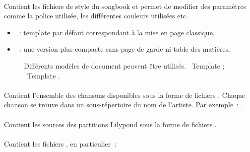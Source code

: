 \paragraph{}
Contient les fichiers de style du songbook et permet de modifier des
paramètres comme la police utilisée, les différentes couleurs
utilisées etc.

\begin{itemize}
\item {}~: template par défaut correspondant à la
  mise en page classique.
\item {}~: une version plus compacte sans page de
  garde ni table des matières.
\end{itemize}

\begin{figure}
  \centering
  \hspace{0.1cm}%
  \caption[Templates]{%
    Différents modèles de document peuvent être utilisés.
    ~Template ; %
    ~Template .%
  }%
  \label{fig:templates}
\end{figure}


\paragraph{}
Contient l'ensemble des chansons disponibles sous la forme de fichiers
. Chaque chanson se trouve dans un sous-répertoire du nom
de l'artiste. Par exemple~:
.

\paragraph{}
Contient les sources des partitions Lilypond sous la forme de fichiers
.

\paragraph{}
Contient les fichiers \latex, en particulier~:

